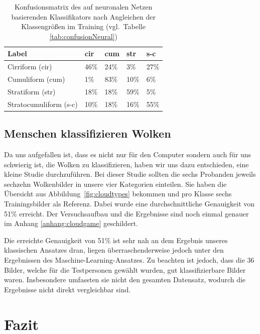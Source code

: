 \documentclass[a4,german]{article}
\begin{document}
\begin{table}
    \centering
    \begin{tabular}{| l | l | l | l | l |}
        \hline
        Label & cir & cum & str & s-c \\ \hline
        Cirriform (cir) & 46\% & 24\% & 3\% & 27\% \\ \hline
        Cumuliform (cum) & 1\% & 83\% & 10\% & 6\% \\ \hline
        Stratiform (str) & 18\% & 18\% & 59\% & 5\% \\ \hline
        Stratocumuliform (s-c) & 10\% & 18\% & 16\% & 55\% \\ \hline
    \end{tabular}
    \caption{Konfusionsmatrix des auf neuronalen Netzen basierenden Klassifikators nach Angleichen der Klassengrößen im Training (vgl.\ Tabelle \ref{tab:confusionNeural})}
    \label{tab:confusionNeural2}
\end{table}


\subsection{Menschen klassifizieren Wolken}

Da uns aufgefallen ist, dass es nicht nur für den Computer sondern auch für uns schwierig ist, die Wolken zu klassifizieren, haben wir uns dazu entschieden, eine kleine Studie durchzuführen.
Bei dieser Studie sollten die sechs Probanden jeweils sechzehn Wolkenbilder in unsere vier Kategorien einteilen.
Sie haben die Übersicht aus Abbildung~\ref{fig:cloudtypes} bekommen und pro Klasse sechs Trainingsbilder als Referenz.
Dabei wurde eine durchschnittliche Genauigkeit von 51\% erreicht. Der Versuchsaufbau und die Ergebnisse sind noch einmal genauer im Anhang \ref{anhang:cloudgame} geschildert.

Die erreichte Genauigkeit von 51\% ist sehr nah an dem Ergebnis unseres klassischen Ansatzes dran, liegen überraschenderweise jedoch unter den Ergebnissen des Maschine-Learning-Ansatzes.
Zu beachten ist jedoch, dass die 36 Bilder, welche für die Testpersonen gewählt wurden, gut klassifizierbare Bilder waren.
Insbesondere umfassten sie nicht den gesamten Datensatz, wodurch die Ergebnisse nicht direkt vergleichbar sind.


\section{Fazit}
\label{sec:fazit}
\end{document}
